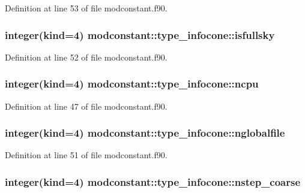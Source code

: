 Definition at line 53 of file modconstant.\-f90.

\hypertarget{structmodconstant_1_1type__infocone_adb5bd3dc9f5e4b1ed2b0b10b14c7fe23}{
\subsubsection[{isfullsky}]{\setlength{\rightskip}{0pt plus 5cm}integer(kind=4) modconstant\-::type\-\_\-infocone\-::isfullsky}}\label{structmodconstant_1_1type__infocone_adb5bd3dc9f5e4b1ed2b0b10b14c7fe23}


Definition at line 52 of file modconstant.\-f90.

\hypertarget{structmodconstant_1_1type__infocone_a2085f6dfc0dfa44c312c1f92021a08c3}{
\subsubsection[{ncpu}]{\setlength{\rightskip}{0pt plus 5cm}integer(kind=4) modconstant\-::type\-\_\-infocone\-::ncpu}}\label{structmodconstant_1_1type__infocone_a2085f6dfc0dfa44c312c1f92021a08c3}


Definition at line 47 of file modconstant.\-f90.

\hypertarget{structmodconstant_1_1type__infocone_a08b0aed7e8b71197bd6f73439a343883}{
\subsubsection[{nglobalfile}]{\setlength{\rightskip}{0pt plus 5cm}integer(kind=4) modconstant\-::type\-\_\-infocone\-::nglobalfile}}\label{structmodconstant_1_1type__infocone_a08b0aed7e8b71197bd6f73439a343883}


Definition at line 51 of file modconstant.\-f90.

\hypertarget{structmodconstant_1_1type__infocone_aa36e3d7e8b1cfd9a111b897917567ad5}{
\subsubsection[{nstep\-\_\-coarse}]{\setlength{\rightskip}{0pt plus 5cm}integer(kind=4) modconstant\-::type\-\_\-infocone\-::nstep\-\_\-coarse}}\label{structmodconstant_1_1type__infocone_aa36e3d7e8b1cfd9a111b897917567ad5}


